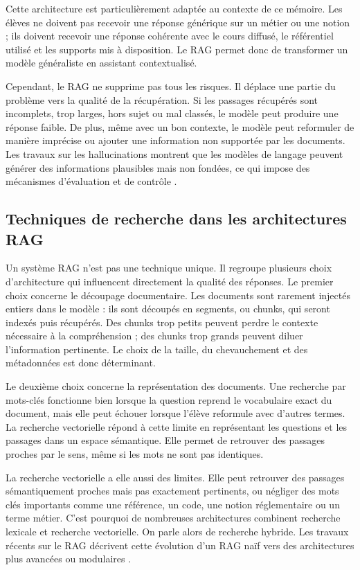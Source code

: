 Cette architecture est particulièrement adaptée au contexte de ce mémoire. Les élèves ne
doivent pas recevoir une réponse générique sur un métier ou une notion ; ils doivent
recevoir une réponse cohérente avec le cours diffusé, le référentiel utilisé et les supports
mis à disposition. Le RAG permet donc de transformer un modèle généraliste en assistant
contextualisé.

Cependant, le RAG ne supprime pas tous les risques. Il déplace une partie du problème
vers la qualité de la récupération. Si les passages récupérés sont incomplets, trop larges,
hors sujet ou mal classés, le modèle peut produire une réponse faible. De plus, même
avec un bon contexte, le modèle peut reformuler de manière imprécise ou ajouter une
information non supportée par les documents. Les travaux sur les hallucinations montrent
que les modèles de langage peuvent générer des informations plausibles mais non fondées,
ce qui impose des mécanismes d'évaluation et de contrôle \cite{ji2023hallucination}.

\subsection{Techniques de recherche dans les architectures RAG}

Un système RAG n'est pas une technique unique. Il regroupe plusieurs choix d'architecture
qui influencent directement la qualité des réponses. Le premier choix concerne le
découpage documentaire. Les documents sont rarement injectés entiers dans le modèle :
ils sont découpés en segments, ou chunks, qui seront indexés puis récupérés. Des chunks
trop petits peuvent perdre le contexte nécessaire à la compréhension ; des chunks trop
grands peuvent diluer l'information pertinente. Le choix de la taille, du chevauchement
et des métadonnées est donc déterminant.

Le deuxième choix concerne la représentation des documents. Une recherche par mots-clés
fonctionne bien lorsque la question reprend le vocabulaire exact du document, mais elle
peut échouer lorsque l'élève reformule avec d'autres termes. La recherche vectorielle
répond à cette limite en représentant les questions et les passages dans un espace
sémantique. Elle permet de retrouver des passages proches par le sens, même si les mots
ne sont pas identiques.

La recherche vectorielle a elle aussi des limites. Elle peut retrouver des passages
sémantiquement proches mais pas exactement pertinents, ou négliger des mots clés
importants comme une référence, un code, une notion réglementaire ou un terme métier.
C'est pourquoi de nombreuses architectures combinent recherche lexicale et recherche
vectorielle. On parle alors de recherche hybride. Les travaux récents sur le RAG décrivent
cette évolution d'un RAG naïf vers des architectures plus avancées ou modulaires
\cite{gao2023retrieval}.

